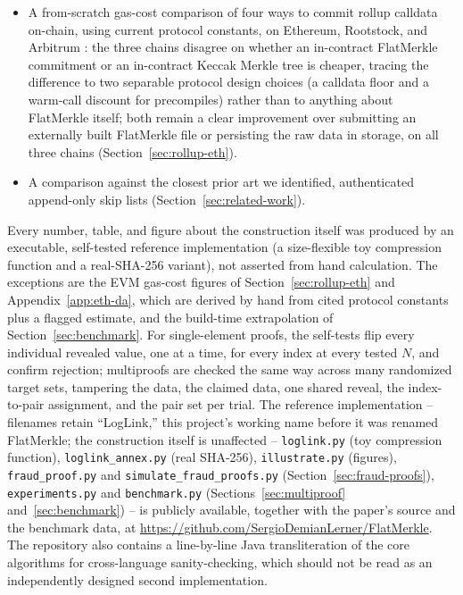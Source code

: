 \begin{itemize}
  BitVM3, two Bitcoin computation-verification protocols, and ESSPI
  \citep{lerner2024bitvmx,linuswoll2026bitvm3,lerner2025esspi} to use a
  FlatMerkle-committed annex as the data-availability layer for an
  optimistic rollup, with watchtowers disputing both non-canonical layouts
  and individually incorrect state transitions
  (Section~\ref{sec:rollup-da}).
\item A from-scratch gas-cost comparison of four ways to commit rollup
  calldata on-chain, using current protocol constants, on Ethereum,
  Rootstock, and Arbitrum
  \citep{eip2028,eip4844,eip7623,eip2929,eip2200,eip152,rsk2022,rskip400,rskip153,rskip239,rskjgascost,arbos40,arbos51}:
  the three chains disagree on whether an in-contract FlatMerkle
  commitment or an in-contract Keccak Merkle tree is cheaper, tracing the
  difference to two separable protocol design choices (a calldata floor
  and a warm-call discount for precompiles) rather than to anything about
  FlatMerkle itself; both remain a clear improvement over submitting an
  externally built FlatMerkle file or persisting the raw data in storage,
  on all three chains (Section~\ref{sec:rollup-eth}).
\item A comparison against the closest prior art we identified, authenticated
  append-only skip lists \citep{maniatis2003,goodrich2001}
  (Section~\ref{sec:related-work}).
\end{itemize}

Every number, table, and figure about the construction itself was
produced by an executable, self-tested reference implementation (a
size-flexible toy compression function and a real-SHA-256 variant), not
asserted from hand calculation. The exceptions are the EVM gas-cost figures
of Section~\ref{sec:rollup-eth} and Appendix~\ref{app:eth-da}, which are
derived by hand from cited protocol constants plus a flagged estimate, and
the build-time extrapolation of Section~\ref{sec:benchmark}. For single-element proofs, the self-tests flip every
individual revealed value, one at a time, for every index at every tested
$N$, and confirm rejection; multiproofs are checked the same way across
many randomized target sets, tampering the data, the claimed data, one
shared reveal, the index-to-pair assignment, and the pair set per trial. The reference implementation -- filenames retain ``LogLink,'' this
project's working name before it was renamed FlatMerkle; the construction
itself is unaffected -- \texttt{loglink.py} (toy compression function),
\texttt{loglink\_annex.py} (real SHA-256),
\texttt{illustrate.py} (figures), \texttt{fraud\_proof.py} and
\texttt{simulate\_fraud\_proofs.py} (Section~\ref{sec:fraud-proofs}),
\texttt{experiments.py} and \texttt{benchmark.py} (Sections~\ref{sec:multiproof}
and~\ref{sec:benchmark}) -- is publicly available, together with the
paper's source and the benchmark data, at
\url{https://github.com/SergioDemianLerner/FlatMerkle}. The repository
also contains a line-by-line Java transliteration of the core algorithms
for cross-language sanity-checking, which should not be read as an
independently designed second implementation.
